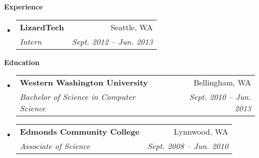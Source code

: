 \documentclass[letterpaper,11pt]{article}
\makeatletter
\newcommand{\resheading}[1]{{\large \colorbox{mygrey}{\begin{minipage}{\textwidth}{\textbf{#1 \vphantom{p\^{E}}}}\end{minipage}}}}
\newcommand{\ressubheading}[4]{
\begin{tabular*}{6.5in}{l@{\extracolsep{\fill}}r}
		\textbf{#1} & #2 \\
		\textit{#3} & \textit{#4} \\
\end{tabular*}\vspace{-6pt}}
\makeatother
\begin{document}
\resheading{Experience}
	\begin{itemize}
		\item 
			\ressubheading{{LizardTech }}{Seattle, WA}{Intern}{Sept. 2012 -- Jun. 2013}


	\end{itemize}  %
	
\resheading{Education}
	\begin{itemize}
		\item
			\ressubheading{{Western Washington University}}{Bellingham, WA}{{Bachelor of Science in Computer Science}}{Sept. 2010 -- Jun. 2013}
			
		\item
			\ressubheading{{Edmonds Community College}}{Lynnwood, WA}{{Associate of Science}}{Sept. 2008 -- Jun. 2010}

	\end{itemize} %
\end{document}
